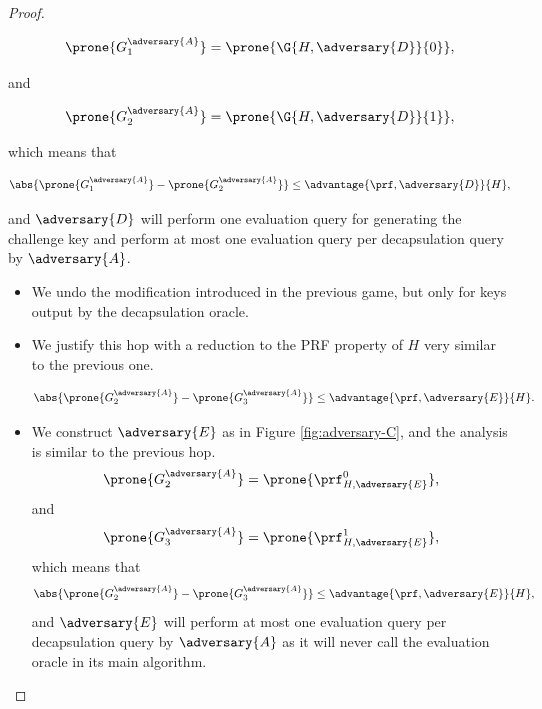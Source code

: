 \begin{proof}
\begin{itemize}
                        \[
                            \prone{G^{\adversary{A}}_1} = \prone{\G{H, \adversary{D}}{0}},
                        \]

                        and

                        \[
                            \prone{G^{\adversary{A}}_2} = \prone{\G{H, \adversary{D}}{1}},
                        \]

                        which means that

                        \[
                            \abs{\prone{G^{\adversary{A}}_1} - \prone{G^{\adversary{A}}_2}} \leq \advantage{\prf, \adversary{D}}{H},
                        \]

                        and $\adversary{D}$ will perform one evaluation query for generating the challenge key and perform at most one evaluation query per decapsulation query by $\adversary{A}$.
                    \end{itemize}

                    \begin{itemize}
                    \item[\textbf{Game 3}]
                        We undo the modification introduced in the previous game, but only for keys output by the decapsulation oracle.
                    \item[\emph{Claim 3}]
                        We justify this hop with a reduction to the PRF property of $H$ very similar to the previous one.

                        \[
                            \abs{\prone{G^{\adversary{A}}_2} - \prone{G^{\adversary{A}}_3}} \leq \advantage{\prf, \adversary{E}}{H}.
                        \]

                    \item[\emph{Proof}]
                        We construct $\adversary{E}$ as in Figure \ref{fig:adversary-C}, and the analysis is similar to the previous hop.
                        \[ \prone{G^{\adversary{A}}_2} = \prone{\prf^{0}_{H, \adversary{E}}}, \]
                        and
                        \[ \prone{G^{\adversary{A}}_3} = \prone{\prf^1_{H, \adversary{E}}}, \]
                        which means that
                        \[
                            \abs{\prone{G^{\adversary{A}}_2} - \prone{G^{\adversary{A}}_3}} \leq \advantage{\prf, \adversary{E}}{H},
                        \]
                        and $\adversary{E}$ will perform at most one evaluation query per decapsulation query by $\adversary{A}$ as it will never call the evaluation oracle in its main algorithm.
                    \end{itemize}


\end{proof}
